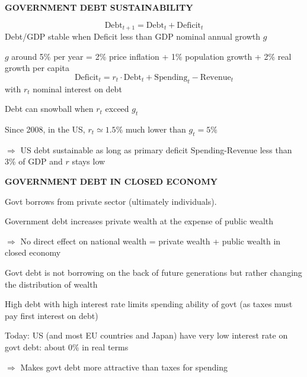 \documentclass[landscape]{slides}
\begin{document}
\begin{slide}

\end{slide}



%


\begin{slide}
\begin{center}
{\bf GOVERNMENT DEBT SUSTAINABILITY}
\end{center}
\[ \text{Debt}_{t+1}=\text{Debt}_t + \text{Deficit}_t  \]
Debt/GDP stable when Deficit less than GDP nominal annual growth $g$ 

$g$ around 5\% per year = 2\% price inflation + 1\% population growth + 2\% real growth per capita
\bigskip
\[ \text{Deficit}_t =  r_t \cdot \text{Debt}_t + \text{Spending}_t - \text{Revenue}_t \]
with $r_t$ nominal interest on debt

Debt can snowball when $r_t$ exceed $g_t$

Since 2008, in the US, $r_t \simeq 1.5\%$ much lower than $g_t=5\%$

$\Rightarrow$ US debt sustainable as long as primary deficit Spending-Revenue less than 3\% of GDP
and $r$ stays low
\end{slide}



\begin{slide}
\begin{center}
{\bf GOVERNMENT DEBT IN CLOSED ECONOMY}
\end{center}
Govt borrows from private sector (ultimately individuals). 

Government debt increases private wealth at the expense of public wealth

$\Rightarrow$ No direct effect on national wealth = private wealth + public wealth in closed economy

Govt debt is not borrowing on the back of future generations but rather changing 
the distribution of wealth 

High debt with high interest rate limits spending ability of govt (as taxes must pay first
interest on debt)

Today: US (and most EU countries and Japan) have very low interest rate on govt debt: about 0\% in real terms 

$\Rightarrow$ Makes govt debt more attractive than taxes for spending 



\end{slide}
\end{document}
